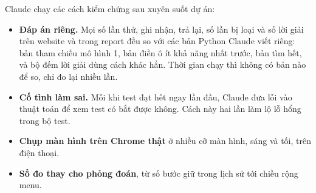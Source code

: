 Claude chạy các cách kiểm chứng sau xuyên suốt dự án:

\begin{itemize}
  \item \textbf{Đáp án riêng.} Mọi số lần thử, ghi nhận, trả lại, số lần bị loại và số lời giải trên website và trong report đều so với các bản Python Claude viết riêng: bản tham chiếu mô hình 1, bản điền ô ít khả năng nhất trước, bản tìm hết, và bộ đếm lời giải dùng cách khác hẳn. Thời gian chạy thì không có bản nào để so, chỉ đo lại nhiều lần.
  \item \textbf{Cố tình làm sai.} Mỗi khi test đạt hết ngay lần đầu, Claude đưa lỗi vào thuật toán để xem test có bắt được không. Cách này hai lần làm lộ lỗ hổng trong bộ test.
  \item \textbf{Chụp màn hình trên Chrome thật} ở nhiều cỡ màn hình, sáng và tối, trên điện thoại.
  \item \textbf{Số đo thay cho phỏng đoán}, từ số bước giữ trong lịch sử tới chiều rộng menu.
\end{itemize}
